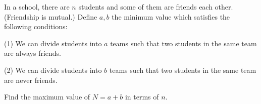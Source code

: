 In a school, there are $n$ students and some of them are friends each other. (Friendship is mutual.) Define $ a, b $ the minimum value which satisfies the following conditions:

(1) We can divide students into $ a $ teams such that two students in the same team are always friends.

(2) We can divide students into $ b $ teams such that two students in the same team are never friends.

Find the maximum value of $ N = a+b $ in terms of $n$.